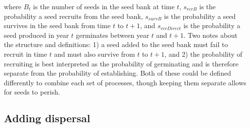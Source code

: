\documentclass[]{article}
\begin{document}
where \(B_t\) is the number of seeds in the seed bank at time \(t\),
\(s_{rcrB}\) is the probability a seed recruits from the seed bank,
\(s_{survB}\) is the probability a seed survives in the seed bank from
time \(t\) to \(t+1\), and \(s_{rcrDirect}\) is the probability a seed
produced in year \(t\) germinates between year \(t\) and \(t+1\). Two
notes about the structure and definitions: 1) a seed added to the seed
bank must fail to recruit in time \(t\) and must also survive from \(t\)
to \(t+1\), and 2) the probability of recruiting is best interpreted as
the probability of germinating and is therefore separate from the
probability of establishing. Both of these could be defined differently
to combine each set of processes, though keeping them separate allows
for seeds to perish.

\subsection{Adding dispersal}
\end{document}
